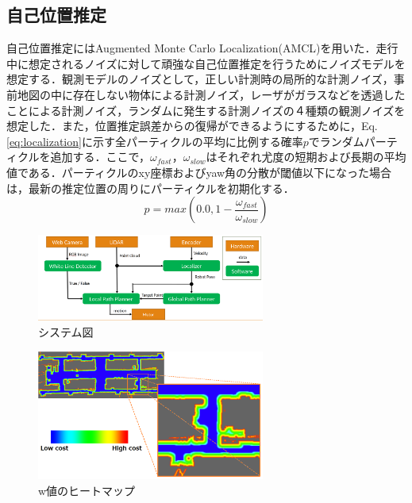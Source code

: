 \documentclass{jarticle}
\renewcommand{\%}{\textsf{\char`\%}}
\begin{document}
\subsection{自己位置推定}
自己位置推定にはAugmented Monte Carlo Localization(AMCL)\cite{localization}を用いた．走行中に想定されるノイズに対して頑強な自己位置推定を行うためにノイズモデルを想定する．観測モデルのノイズとして，正しい計測時の局所的な計測ノイズ，事前地図の中に存在しない物体による計測ノイズ，レーザがガラスなどを透過したことによる計測ノイズ，ランダムに発生する計測ノイズの４種類の観測ノイズを想定した．また，位置推定誤差からの復帰ができるようにするために，Eq.\ref{eq:localization}に示す全パーティクルの平均に比例する確率$p$でランダムパーティクルを追加する．ここで，$\omega_{fast}$，$\omega_{slow}$はそれぞれ尤度の短期および長期の平均値である．パーティクルのxy座標およびyaw角の分散が閾値以下になった場合は，最新の推定位置の周りにパーティクルを初期化する．
\vspace{-3mm}
\begin{equation}
	p = max(0.0 , 1-\frac{\omega_{fast}}{\omega_{slow}})
\label{eq:localization}
\end{equation}
\begin{figure}
	\includegraphics[width=7.5cm]{./picture/system.png}
	\caption{システム図}
	\label{fig:system}
\end{figure}
\begin{figure}
	\includegraphics[width=7.5cm]{./picture/wallcostmap.png}
	\caption{w値のヒートマップ}
	\label{fig:wallcostmap}
\end{figure}
\vspace{-3mm}
\end{document}
